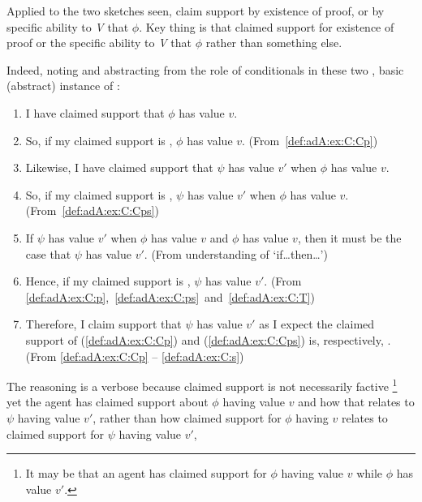 \begin{note}
  Applied to the two sketches seen, claim support by existence of proof, or by specific ability to \emph{V} that \(\phi\).
  Key thing is that claimed support for existence of proof or the specific ability to \emph{V} that \(\phi\) rather than something else.

  Indeed, noting and abstracting from the role of conditionals in these two , basic (abstract) instance of \adA{}:

  {
    \small
    \begin{enumerate}[label=\arabic*., ref=\arabic*]
    \item\label{def:adA:ex:C:Cp} I have claimed support that \(\phi\) has value \(v\).
    \item\label{def:adA:ex:C:p} So, if my claimed support is \nmom{}, \(\phi\) has value \(v\). \hfill(From~\ref{def:adA:ex:C:Cp})
    \item\label{def:adA:ex:C:Cps} Likewise, I have claimed support that \(\psi\) has value \(v'\) when \(\phi\) has value \(v\).
    \item\label{def:adA:ex:C:ps} So, if my claimed support is \nmom{}, \(\psi\) has value \(v'\) when \(\phi\) has value \(v\). \hfill(From~\ref{def:adA:ex:C:Cps})
    \item\label{def:adA:ex:C:T} If \(\psi\) has value \(v'\) when \(\phi\) has value \(v\) and \(\phi\) has value \(v\), then it must be the case that \(\psi\) has value \(v'\). \hfill (From understanding of `if\dots then\dots')
    \item\label{def:adA:ex:C:s} Hence, if my claimed support is \nmom{}, \(\psi\) has value \(v'\).\newline
      \mbox{}\hfill (From \ref{def:adA:ex:C:p},~\ref{def:adA:ex:C:ps}~and~\ref{def:adA:ex:C:T})
    \item Therefore, I claim support that \(\psi\) has value \(v'\) as I expect the claimed support of (\ref{def:adA:ex:C:Cp}) and (\ref{def:adA:ex:C:Cps}) is, respectively, \nmom{}. \hfill (From \ref{def:adA:ex:C:Cp} -- \ref{def:adA:ex:C:s})
    \end{enumerate}
  }
  The reasoning is a verbose because claimed support is not necessarily factive
  \nolinebreak
  \footnote{
    It may be that an agent has claimed support for \(\phi\) having value \(v\) while \(\phi\) has value \(v'\).
  }
  yet the agent has claimed support about \(\phi\) having value \(v\) and how that relates to \(\psi\) having value \(v'\), rather than how claimed support for \(\phi\) having \(v\) relates to claimed support for \(\psi\) having value \(v'\),

\end{note}
